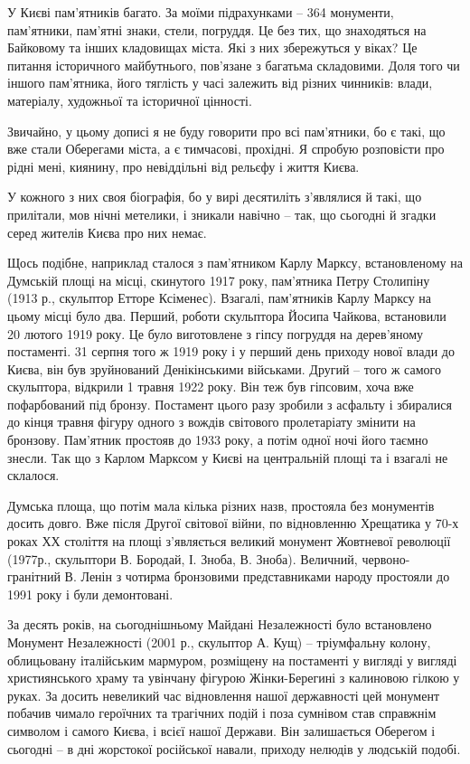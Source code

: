 У Києві пам'ятників багато. За моїми підрахунками – 364 монументи, пам'ятники,
пам'ятні знаки, стели, погруддя. Це без тих, що знаходяться на Байковому та
інших кладовищах міста. Які з них збережуться у віках? Це питання історичного
майбутнього, пов'язане з багатьма складовими. Доля того чи іншого пам'ятника,
його тяглість у часі залежить від різних чинників: влади, матеріалу, художньої
та історичної цінності.

Звичайно, у цьому дописі я не буду говорити про всі пам'ятники, бо є такі, що
вже стали Оберегами міста, а є тимчасові, прохідні. Я спробую розповісти про
рідні мені, киянину, про невіддільні від рельєфу і життя Києва.

У кожного з них своя біографія, бо у вирі десятиліть з'являлися й такі, що
прилітали, мов нічні метелики, і зникали навічно – так, що сьогодні й згадки
серед жителів Києва про них немає.

Щось подібне, наприклад сталося з пам'ятником Карлу Марксу, встановленому на
Думській площі на місці, скинутого 1917 року, пам'ятника Петру Столипіну (1913
р., скульптор Етторе Ксіменес). Взагалі, пам'ятників Карлу Марксу на цьому
місці було два. Перший, роботи скульптора Йосипа Чайкова, встановили 20 лютого
1919 року. Це було виготовлене з гіпсу погруддя на дерев'яному постаменті. 31
серпня того ж 1919 року і у перший  день приходу нової влади до Києва, він був
зруйнований Денікінськими військами. Другий – того ж самого скульптора,
відкрили 1 травня 1922 року. Він теж був гіпсовим, хоча вже пофарбований під
бронзу. Постамент цього разу зробили з асфальту і збиралися до кінця травня
фігуру одного з вождів світового пролетаріату змінити на бронзову. Пам'ятник
простояв до 1933 року, а потім одної ночі його таємно знесли. Так що з Карлом
Марксом у Києві на центральній площі та і взагалі не склалося.

Думська площа, що потім мала кілька різних назв, простояла без монументів
досить довго. Вже після Другої світової війни, по відновленню Хрещатика у 70-х
роках ХХ століття на площі з'являється великий монумент Жовтневої революції
(1977р., скульптори В. Бородай, І. Зноба, В. Зноба). Величний,
червоно-гранітний В. Ленін з чотирма бронзовими представниками народу простояли
до 1991 року і були демонтовані.

За десять років, на сьогоднішньому Майдані Незалежності було встановлено
Монумент Незалежності (2001 р., скульптор А. Кущ) – тріумфальну колону,
облицьовану італійським мармуром, розміщену на постаменті у вигляді у вигляді
християнського храму та увінчану фігурою Жінки-Берегині з калиновою гілкою у
руках. За досить невеликий час відновлення нашої державності цей монумент
побачив чимало героїчних та трагічних подій і поза сумнівом став справжнім
символом і самого Києва, і всієї нашої Держави. Він залишається Оберегом і
сьогодні – в дні жорстокої російської навали, приходу нелюдів у людській
подобі.

